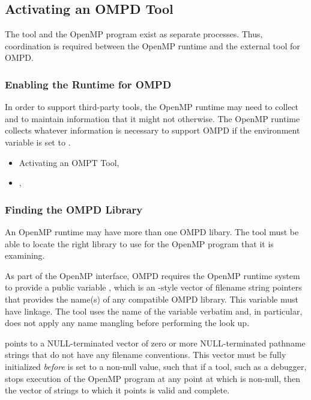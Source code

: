 \subsection{Activating an OMPD Tool}
\label{subsec:activating}

The tool and the OpenMP program exist as separate processes. 
Thus, coordination is required between the OpenMP runtime
and the external tool for OMPD.

\subsubsection{Enabling the Runtime for OMPD}
\label{subsubsec:enabling-ompd}

In order to support third-party tools, the OpenMP runtime may need to collect
and to maintain information that it might not otherwise. The OpenMP runtime 
collects whatever information is necessary to support OMPD if the environment 
variable  is set to .

\crossreferences
\begin{itemize}
\item Activating an OMPT Tool, 

\item   {}, 
\end{itemize}



\subsubsection{Finding the OMPD Library}
\label{subsubsec:finding-the-ompd}

An OpenMP runtime may have more than one OMPD libary. The tool must be able 
to locate the right library to use for the OpenMP program that it is examining.

As part of the OpenMP interface, OMPD requires the OpenMP runtime system to
provide a public variable , which is an -style
vector of filename string pointers that provides the name(s) of any compatible 
OMPD library. This variable must have  linkage. The tool uses the name 
of the variable verbatim and, in particular, does not apply any name mangling 
before performing the look up.

 points to a NULL-terminated vector of zero or more 
NULL-terminated pathname strings that do not have any filename conventions. 
This vector must be fully initialized \emph{before}  
is set to a non-null value, such that if a tool, such as a debugger, stops 
execution of the OpenMP program at any point at which  
is non-null, then the vector of strings to which it points is valid and complete.

